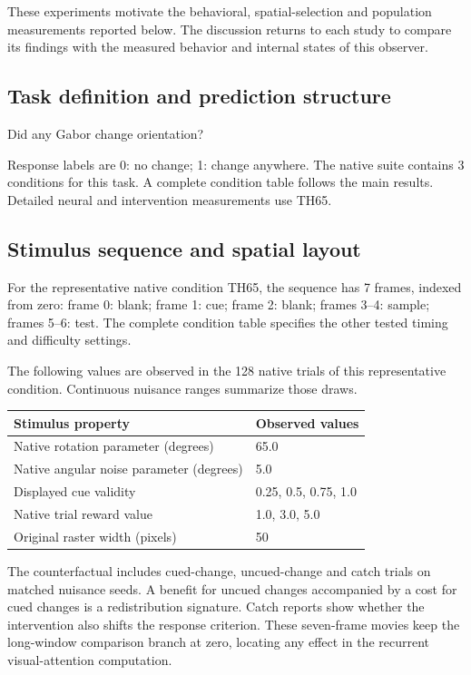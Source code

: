 \documentclass[11pt]{article}
\begin{document}
These experiments motivate the behavioral, spatial-selection and population measurements reported below. The discussion returns to each study to compare its findings with the measured behavior and internal states of this observer.
\subsection{Task definition and prediction structure}
Did any Gabor change orientation?

Response labels are 0: no change; 1: change anywhere. The native suite contains 3 conditions for this task. A complete condition table follows the main results. Detailed neural and intervention measurements use TH65.

\subsection{Stimulus sequence and spatial layout}
For the representative native condition TH65, the sequence has 7 frames, indexed from zero: frame 0: blank; frame 1: cue; frame 2: blank; frames 3--4: sample; frames 5--6: test. The complete condition table specifies the other tested timing and difficulty settings.

The following values are observed in the 128 native trials of this representative condition. Continuous nuisance ranges summarize those draws.
\begin{center}\small\begin{tabular}{p{}p{}}\toprule Stimulus property & Observed values\\\midrule
Native rotation parameter (degrees) & 65.0\\
Native angular noise parameter (degrees) & 5.0\\
Displayed cue validity & 0.25, 0.5, 0.75, 1.0\\
Native trial reward value & 1.0, 3.0, 5.0\\
Original raster width (pixels) & 50\\
\bottomrule\end{tabular}\normalsize\end{center}
The counterfactual includes cued-change, uncued-change and catch trials on matched nuisance seeds. A benefit for uncued changes accompanied by a cost for cued changes is a redistribution signature. Catch reports show whether the intervention also shifts the response criterion. These seven-frame movies keep the long-window comparison branch at zero, locating any effect in the recurrent visual-attention computation.
\end{document}
